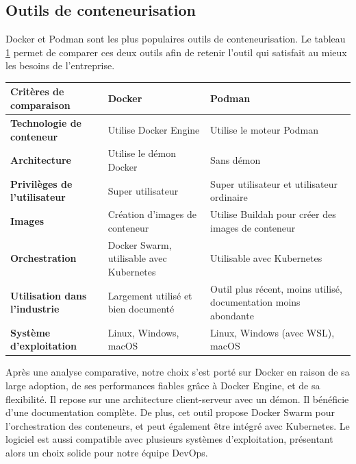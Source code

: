 \subsection{Outils de conteneurisation}
Docker et Podman sont les plus populaires outils de conteneurisation. Le tableau \ref{tableau:comparatif2} \cite{aleksic2022} permet de comparer ces deux outils afin de retenir l’outil qui satisfait au mieux les besoins de l’entreprise.
\begin{table}[H]
\centering
\caption{Tableau comparatif des outis de conteneurisation Docker et Podman.}
\begin{longtable}{|p{4.5cm}|p{5.5cm}|p{5.5cm}|}
\hline
\textbf{Critères de comparaison} & \textbf{Docker} & \textbf{Podman} \\
\hline
\textbf{Technologie de conteneur} & Utilise Docker Engine & Utilise le moteur Podman \\
\hline
\textbf{Architecture} & Utilise le démon Docker & Sans démon \\
\hline
\textbf{Privilèges de l'utilisateur} & Super utilisateur & Super utilisateur et utilisateur ordinaire \\
\hline
\textbf{Images} & Création d'images de conteneur & Utilise Buildah pour créer des images de conteneur \\ 
\hline
\textbf{Orchestration} & Docker Swarm, utilisable avec Kubernetes & Utilisable avec Kubernetes  \\ 
\hline
\textbf{Utilisation dans l'industrie} & Largement utilisé et bien documenté & Outil plus récent, moins utilisé, documentation moins abondante\\
\hline
\textbf{Système d'exploitation} & Linux, Windows, macOS & Linux, Windows (avec WSL), macOS\\
\hline
\end{longtable}
\label{tableau:comparatif2}
\end{table}

Après une analyse comparative, notre choix s'est porté sur Docker en raison de sa large adoption, de ses performances fiables grâce à Docker Engine, et de sa flexibilité. Il repose sur une architecture client-serveur avec un démon. Il bénéficie d'une documentation complète. De plus, cet outil propose Docker Swarm pour l'orchestration des conteneurs, et peut également être intégré avec Kubernetes. Le logiciel est aussi compatible avec plusieurs systèmes d'exploitation, présentant alors un choix solide pour notre équipe DevOps.

